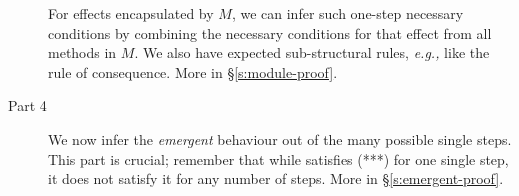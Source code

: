 \begin{description}
For effects encapsulated by $M$, we can infer such one-step
necessary conditions by combining the necessary conditions for that effect from 
all   methods in $M$. We also have  expected sub-structural rules, \emph{e.g.,} 
 like the rule of consequence.
More in \S\ref{s:module-proof}.



\item[Part 4]
  
We now infer the \emph{emergent} behaviour out of the many possible 
single steps.  This part is crucial;   remember that while  satisfies  
(***) for one single step, it does not satisfy it for any number of steps. More in \S\ref{s:emergent-proof}.
 
\end{description} 
